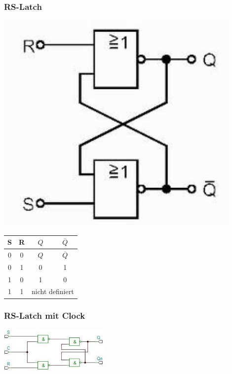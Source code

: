	\begin{multicols}{2}
		\subsubsection{RS-Latch}
			\begin{minipage}{4 cm}
				\includegraphics[width=0.9\textwidth]{pics/rs_latch}
			\end{minipage}
			\begin{minipage}{4 cm}
				\begin{tabular}{|cc|cc|}
					\hline
						S & R & $Q$ & $\overline{Q}$ \\
					\hline	
						0 & 0 & $Q$ & $\overline{Q}$ \\
						0 & 1 & 0 & 1 \\
						1 & 0 & 1 & 0 \\
						1 & 1 & \multicolumn{2}{c|}{nicht definiert} \\
					\hline
				\end{tabular}
			\end{minipage}
		
		\subsubsection{RS-Latch mit Clock}
			\includegraphics[width=0.4\textwidth]{pics/rs_latch_clock}
		\columnbreak
		

\end{multicols}
